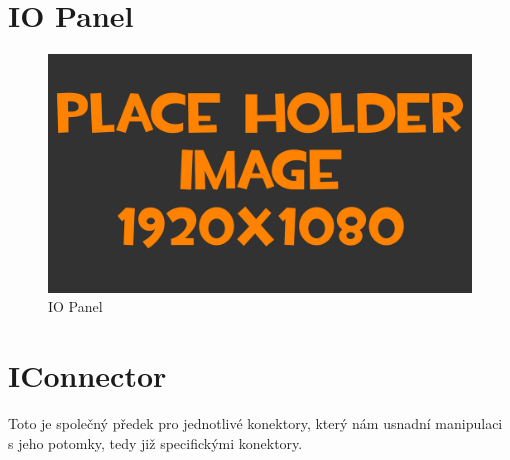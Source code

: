 
\section{IO Panel}
\begin{figure}[h!]
	\centering
	\includegraphics[width=\textwidth]{pictures/placeHolderFHD.png}
    	\caption{IO Panel}
   	\label{fig:panelIO}
\end{figure}

\newpage
\section{IConnector}

Toto je společný předek pro jednotlivé konektory, který nám usnadní manipulaci s jeho potomky, tedy již specifickými konektory.





%
%
